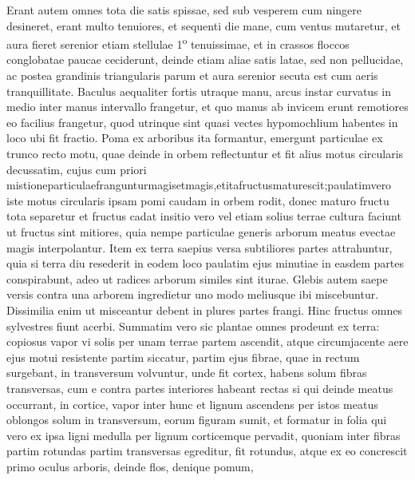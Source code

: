Erant autem omnes tota die satis spissae, sed sub vesperem cum ningere desineret, erant multo tenuiores, et sequenti die mane, cum ventus mutaretur, et aura fieret serenior etiam stellulae 1\textsuperscript{o} tenuissimae, et in crassos floccos conglobatae paucae ceciderunt, deinde etiam aliae satis latae, sed non pellucidae, ac postea grandinis triangularis parum et aura serenior secuta est cum aeris
tranquillitate. 
\pend%
\pstart%
Baculus aequaliter fortis utraque manu, arcus instar curvatus in medio inter manus intervallo frangetur, et quo manus ab invicem erunt remotiores eo facilius frangetur, quod utrinque sint quasi vectes hypomochlium habentes in loco ubi fit fractio.
\pend%
\pstart
Poma ex arboribus ita formantur, emergunt particulae ex trunco recto motu, quae deinde in orbem reflectuntur et fit alius motus circularis decussatim, cujus cum priori mistione\hfill particulae\hfill franguntur\hfill magis\hfill et\hfill magis,\hfill et\hfill ita\hfill fructus\hfill maturescit;\hfill paulatim\hfill vero
\pend
\newpage
\pstart%
\noindent iste motus circularis ipsam pomi caudam in orbem rodit, donec maturo fructu tota separetur et fructus cadat insitio vero vel etiam solius terrae cultura faciunt ut fructus
%
sint mitiores, quia nempe particulae
generis arborum meatus evectae magis interpolantur. Item ex terra saepius versa subtiliores partes attrahuntur, quia si terra diu resederit in eodem loco paulatim ejus minutiae in easdem partes conspirabunt, adeo ut radices arborum similes sint iturae. Glebis autem saepe versis contra una arborem ingredietur uno modo
meliusque ibi miscebuntur. Dissimilia enim ut misceantur debent in plures partes frangi. Hinc fructus omnes sylvestres fiunt acerbi. Summatim vero sic plantae omnes prodeunt ex terra: copiosus vapor vi solis per unam terrae partem ascendit, atque circumjacente aere ejus motui resistente partim siccatur, partim ejus fibrae, quae in rectum surgebant, in transversum volvuntur, unde fit cortex, habens solum fibras transversas, cum e contra partes interiores habeant rectas si qui deinde meatus occurrant, in cortice, vapor inter hunc et lignum ascendens per istos meatus oblongos solum in transversum, eorum figuram sumit, et formatur in folia qui vero ex ipsa ligni medulla per lignum corticemque pervadit, quoniam inter fibras partim rotundas partim transversas egreditur, fit rotundus, atque ex eo concrescit primo oculus arboris, deinde flos, denique pomum,
